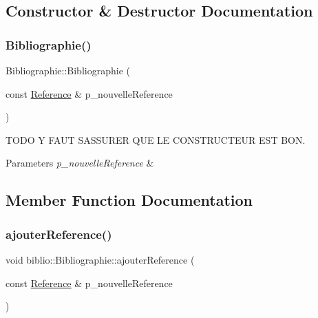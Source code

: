 \subsection{Constructor \& Destructor Documentation}
\mbox{\label{classbiblio_1_1Bibliographie_a41550239d35963ee03672d52ba4e5973}} 
\subsubsection{\texorpdfstring{Bibliographie()}{Bibliographie()}}
{\footnotesize\ttfamily Bibliographie\+::\+Bibliographie (\begin{DoxyParamCaption}\item[{const \hyperlink{classbiblio_1_1Reference}{Reference} \&}]{p\+\_\+nouvelle\+Reference }\end{DoxyParamCaption})}



T\+O\+DO Y F\+A\+UT S\+A\+S\+S\+U\+R\+ER Q\+UE LE C\+O\+N\+S\+T\+R\+U\+C\+T\+E\+UR E\+ST B\+ON. 


\begin{DoxyParams}{Parameters}
{\em p\+\_\+nouvelle\+Reference} & \\
\hline
\end{DoxyParams}


\subsection{Member Function Documentation}
\mbox{\label{classbiblio_1_1Bibliographie_aa873f6c1a158c807072f91f3a5b33947}} 
\subsubsection{\texorpdfstring{ajouter\+Reference()}{ajouterReference()}}
{\footnotesize\ttfamily void biblio\+::\+Bibliographie\+::ajouter\+Reference (\begin{DoxyParamCaption}\item[{const \hyperlink{classbiblio_1_1Reference}{Reference} \&}]{p\+\_\+nouvelle\+Reference }\end{DoxyParamCaption})\hspace{0.3cm}{\ttfamily [inline]}}



